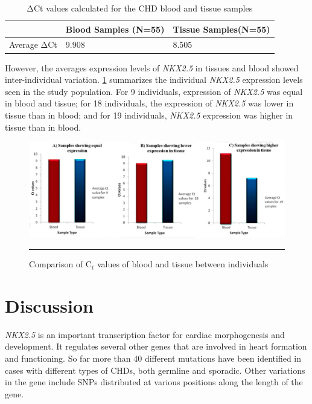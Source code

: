 \begin{refsection}
\begin{table}[!tb]
\centering
\caption[ΔCt values calculated for the CHD blood and tissue samples]{ΔCt values calculated for the CHD blood and tissue samples}
\label{tab:5_10}
\begin{tabular}{ p{2in}  P{1.5in}  P{1.5in} }
\toprule
		 & \textbf{Blood Samples (N=55)} & \textbf{Tissue Samples(N=55)} \\ \toprule
	Average ΔCt & 9.908 & 8.505 \\ \bottomrule
\end{tabular}
\end{table}

However, the averages expression levels of \textit{NKX2.5} in tissues and blood showed inter-individual variation. \cref{fig:5_13} summarizes the individual \textit{NKX2.5} expression levels seen in the study population. For 9 individuals, expression of \textit{NKX2.5} was equal in blood and tissue; for 18 individuals, the expression of \textit{NKX2.5} was lower in tissue than in blood; and for 19 individuals, \textit{NKX2.5} expression was higher in tissue than in blood.

\begin{figure}[!htb]
\centering
\includegraphics[width=\linewidth]{Figures/Figure5_13.pdf}
\rule{35em}{0.5pt}
\caption[Comparison of C$_t$ values of blood and tissue between individuals]{Comparison of C$_t$ values of blood and tissue between individuals}
\label{fig:5_13}
\end{figure}

\section{Discussion}

\textit{NKX2.5} is an important transcription factor for cardiac morphogenesis and development. It regulates several other genes that are involved in heart formation and functioning. So far more than 40 different mutations have been identified in cases with different types of CHDs, both germline and sporadic. Other variations in the gene include SNPs distributed at various positions along the length of the gene. 


\end{refsection}
